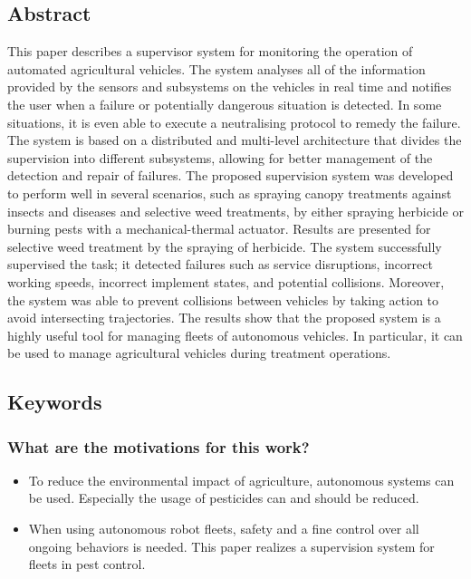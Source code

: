     \subsection*{Abstract}
    This paper describes a supervisor system for monitoring the operation of automated
    agricultural vehicles. The system analyses all of the information provided by the sensors and
    subsystems on the vehicles in real time and notifies the user when a failure or potentially
    dangerous situation is detected. In some situations, it is even able to execute a neutralising
    protocol to remedy the failure. The system is based on a distributed and multi-level architecture
    that divides the supervision into different subsystems, allowing for better management of the
    detection and repair of failures. The proposed supervision system was developed to perform
    well in several scenarios, such as spraying canopy treatments against insects and diseases
    and selective weed treatments, by either spraying herbicide or burning pests with a
    mechanical-thermal actuator. Results are presented for selective weed treatment by the
    spraying of herbicide. The system successfully supervised the task; it detected failures such
    as service disruptions, incorrect working speeds, incorrect implement states, and potential
    collisions. Moreover, the system was able to prevent collisions between vehicles by taking
    action to avoid intersecting trajectories. The results show that the proposed system is a highly
    useful tool for managing fleets of autonomous vehicles. In particular, it can be used to
    manage agricultural vehicles during treatment operations.
    
    \subsection*{Keywords}
    
     
    \subsubsection*{What are the motivations for this work?}
    \begin{itemize}
        \item To reduce the environmental impact of agriculture, autonomous systems can be used. Especially the usage of pesticides can and should be reduced. 
        \item When using autonomous robot fleets, safety and a fine control over all ongoing behaviors is needed. This paper realizes a supervision system for fleets in pest control.
    \end{itemize}
